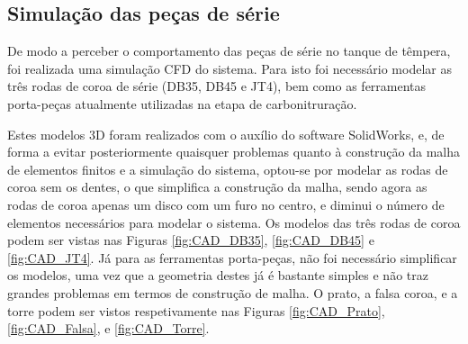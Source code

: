 \subsection{Simulação das peças de série} \label{ssec:materiais_concecao_sim_serie}
\par
De modo a perceber o comportamento das peças de série no tanque de têmpera, foi realizada uma simulação CFD do sistema. Para isto foi necessário modelar as três rodas de coroa de série (DB35, DB45 e JT4), bem como as ferramentas porta-peças atualmente utilizadas na etapa de carbonitruração.
\par
Estes modelos 3D foram realizados com o auxílio do software SolidWorks, e, de forma a evitar posteriormente quaisquer problemas quanto à construção da malha de elementos finitos e a simulação do sistema, optou-se por modelar as rodas de coroa sem os dentes, o que simplifica a construção da malha, sendo agora as rodas de coroa apenas um disco com um furo no centro, e diminui o número de elementos necessários para modelar o sistema. Os modelos das três rodas de coroa podem ser vistas nas Figuras \ref{fig:CAD_DB35}, \ref{fig:CAD_DB45} e \ref{fig:CAD_JT4}. Já para as ferramentas porta-peças, não foi necessário simplificar os modelos, uma vez que a geometria destes já é bastante simples e não traz grandes problemas em termos de construção de malha. O prato, a falsa coroa, e a torre podem ser vistos respetivamente nas Figuras \ref{fig:CAD_Prato}, \ref{fig:CAD_Falsa}, e \ref{fig:CAD_Torre}.
